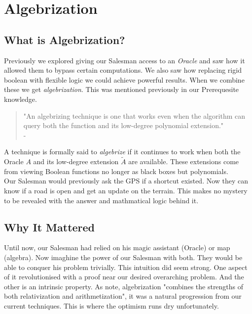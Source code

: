 \documentclass[12pt]{report}
\begin{document}
\newpage
\chapter{Algebrization}
\section{What is Algebrization?}
Previously we explored giving our Salesman access to an \textit{Oracle} and saw how it allowed them to bypass certain computations.
We also saw how replacing rigid boolean with flexible logic we could achieve powerful results.
When we combine these we get \textit{algebrization}.
This was mentioned previously in our Prerequesite knowledge.

\begin{quote}
    "An algebrizing technique is one that works even when the algorithm can query both the function and its low-degree polynomial extension."\\
    - \cite{arora2008algebrization}
\end{quote}
A technique is formally said to \textit{algebrize} if it continues to work when both the Oracle $A$ and its low-degree extension $\tilde{A}$ are available.
These extensions come from viewing Boolean functions no longer as black boxes but polynomials.\\ 
Our Salesman would previously ask the GPS if a shortcut existed.
Now they can know if a road is open and get an update on the terrain.
This makes no mystery to be revealed with the answer and mathmatical logic behind it.

\section{Why It Mattered}
Until now, our Salesman had relied on his magic assistant (Oracle) or map (algebra).
Now imaghine the power of our Salesman with both.
They would be able to conquer his problem trivially.
This intuition did seem strong.
One aspect of it revolutionised with a proof near our desired overarching problem.
And the other is an intrinsic property.
As \cite{arora2009} note, algebrization "combines the strengths of both relativization and arithmetization", it was a natural progression from our current techniques.
This is where the optimism runs dry unfortunately.
\end{document}
